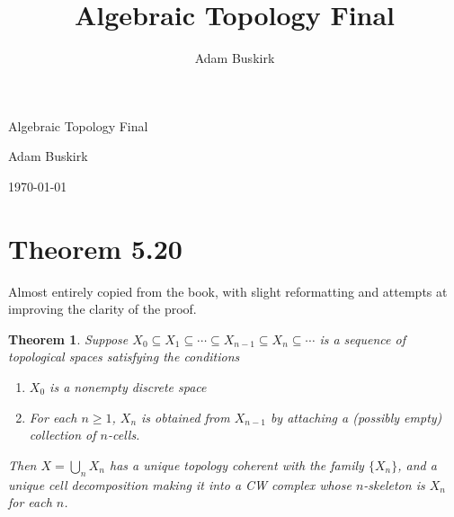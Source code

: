 \documentclass{article}
\title{Algebraic Topology Final}
\author{Adam Buskirk}
\newtheorem{theorem}{Theorem}
\theoremstyle{definition}
\begin{document}
\null\hfill\parbox{40mm}{Algebraic Topology Final\par Adam Buskirk\par\today}

\section*{Theorem 5.20}
Almost entirely copied from the book, with slight reformatting and attempts at improving 
the clarity of the proof.
\renewcommand{\thetheorem}{5.20}
\begin{theorem}
Suppose $X_0 \subseteq X_1 \subseteq \cdots \subseteq X_{n-1} \subseteq X_n \subseteq \cdots$
is a sequence of topological spaces satisfying the conditions
\begin{enumerate}
\item $X_0$ is a nonempty discrete space
\item For each $n \ge 1$, $X_n$ is obtained from $X_{n-1}$ by attaching
a (possibly empty) collection of $n$-cells.
\end{enumerate}
Then $X=\bigcup_n X_n$ has a unique topology coherent with the family $\{X_n\}$, and a unique
cell decomposition making it into a CW complex whose $n$-skeleton is $X_n$ for each $n$.
\end{theorem}
\end{document}
